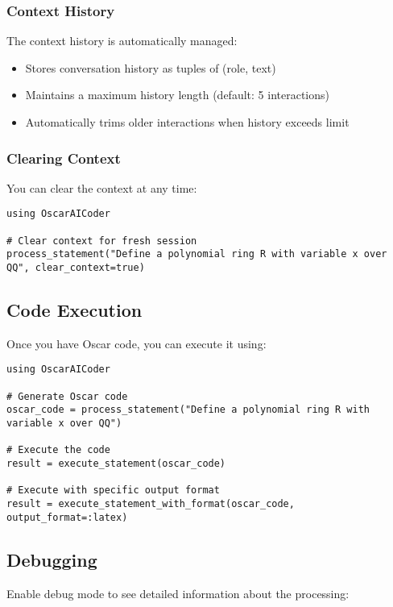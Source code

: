 \documentclass[11pt,a4paper]{article}
\begin{document}
\subsubsection{Context History}

The context history is automatically managed:
\begin{itemize}
    \item Stores conversation history as tuples of (role, text)
    \item Maintains a maximum history length (default: 5 interactions)
    \item Automatically trims older interactions when history exceeds limit
\end{itemize}

\subsubsection{Clearing Context}

You can clear the context at any time:

\begin{lstlisting}
using OscarAICoder

# Clear context for fresh session
process_statement("Define a polynomial ring R with variable x over QQ", clear_context=true)
\end{lstlisting}

\subsection{Code Execution}

Once you have Oscar code, you can execute it using:

\begin{lstlisting}
using OscarAICoder

# Generate Oscar code
oscar_code = process_statement("Define a polynomial ring R with variable x over QQ")

# Execute the code
result = execute_statement(oscar_code)

# Execute with specific output format
result = execute_statement_with_format(oscar_code, output_format=:latex)
\end{lstlisting}

\subsection{Debugging}

Enable debug mode to see detailed information about the processing:
\end{document}
